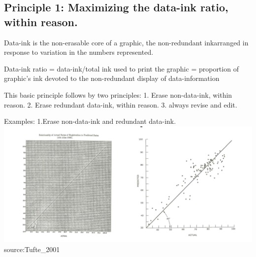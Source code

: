 \documentclass[]{book}
\theoremstyle{definition}
\theoremstyle{definition}
\theoremstyle{definition}
\theoremstyle{remark}
\begin{document}
\subsection{Principle 1: Maximizing the data-ink ratio, within
reason.}\label{principle-1-maximizing-the-data-ink-ratio-within-reason.}

Data-ink is the non-erasable core of a graphic, the non-redundant
inkarranged in response to variation in the numbers represented.

Data-ink ratio = data-ink/total ink used to print the graphic =
proportion of graphic's ink devoted to the non-redundant display of
data-information

This basic principle follows by two principles: 1. Erase non-data-ink,
within reason. 2. Erase redundant data-ink, within reason. 3. always
revise and edit.

Examples: 1.Erase non-data-ink and redundant data-ink.
\includegraphics{images/Tufte_figure1.png} source:Tufte\_2001
\end{document}
